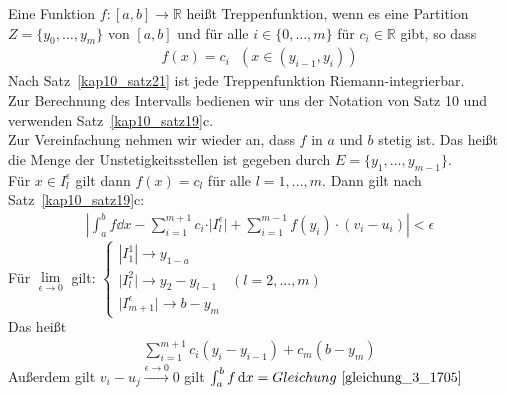 \begin{Definition}{
	Eine Funktion $f: [a,b] \rightarrow \mathbb{R}$ heißt Treppenfunktion, wenn es 
	eine Partition $Z = \{ y_0, \hdots, y_m \}$ von $[a,b]$ und für alle 
	$i \in \{0, \hdots, m\}$ für $c_i \in \mathbb{R}$ gibt, so dass 
	\begin{align*}
		f(x) = c_i \text{ } ( x\in (y_{i-1},y_i))
	\end{align*}
	Nach Satz~\ref{kap10_satz21}
	ist jede Treppenfunktion Riemann-integrierbar. \\
	Zur Berechnung des Intervalls bedienen wir uns der Notation von Satz 10 
	und verwenden Satz~\ref{kap10_satz19}c.\\
	Zur Vereinfachung nehmen wir wieder an, dass $f$ in $a$ und $b$ stetig ist. 
	Das heißt die Menge der Unstetigkeitsstellen ist gegeben durch 
	$E = \{y_1, \hdots, y_{m-1}\}$. \\
	Für $x \in I_l^{\epsilon}$ gilt dann $f(x) = c_l$ für alle $ l = 1, \hdots, m$.
	Dann gilt nach Satz~\ref{kap10_satz19}c:
	\begin{align*}
		\left\vert \int_a^b f \dd{x} - \sum_{i=1}^{m+1} c_i \cdot \vert 
		I_l^{\epsilon}\vert + \sum_{i =1}^{m-1} f(y_i)\cdot (v_i -u_i) \right\vert
		< \epsilon
	\end{align*}
	Für $ \lim\limits_{\epsilon \rightarrow 0}{}$ gilt:
	$\begin{cases} 
		|I_1^1| \rightarrow y_{1-a} & \\
		\vert I_l^2 \vert \rightarrow y_2 - y_{l-1} & ( l = 2,...,m) \\
		\vert I_{m+1}^{\epsilon} \vert \rightarrow b - y_m &
	\end{cases}$ \\
	Das heißt
	\begin{align}
		\label{gleichung_3_1705}
		\sum_{i=1}^{m+1}c_i(y_i -y_{i-1}) + c_m(b-y_m)
	\end{align}
	Außerdem gilt $v_i-u_j \overset{\epsilon \rightarrow 0}{\rightarrow} 0$
	gilt $\int_a^b f\dd{x} = Gleichung~\ref{gleichung_3_1705}$
	
}\end{Definition}
